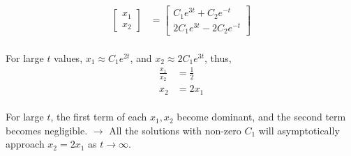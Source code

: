 \documentclass[letterpaper,12pt]{article}
\begin{document}
\begin{align*}
    \begin{bmatrix}
        x_1\\x_2
    \end{bmatrix}
    &= 
    \begin{bmatrix}
        C_1e^{3t}+C_2e^{-t}\\
        2C_1e^{3t} - 2C_2e^{-t}
    \end{bmatrix}
\end{align*}
\paragraph{}For large $t$ values, $x_1 \approx C_1 e^{2t}$, and $x_2 \approx 2C_1e^{3t}$, thus,
\begin{align*}
    \frac{x_1}{x_2} &= \frac{1}{2}\\
    x_2 &= 2x_1
\end{align*}
\paragraph{}For large $t$, the first term of each $x_1, x_2$ become dominant, and the
second term becomes negligible. $\to$ All the solutions with non-zero $C_1$ will 
asymptotically approach $x_2 = 2x_1$ as $t \to \infty$.
\end{document}
